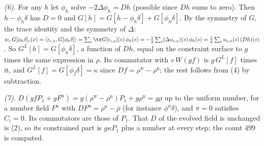 \emph{(6).} For any $h$ let $\phi_{h}$ solve $-2\Delta\phi_{h} = Dh$ (possible since $Dh$ sums to zero). Then $h - \phi_{h}\delta$ has $D = 0$ and $G[h] = G[h - \phi_{h}\delta] + G[\phi_{h}\delta]$. By the symmetry of $G$, the trace identity and the symmetry of $\Delta$: $w_{c}\,G[\phi_{h}\delta]_{c}(x) = \langle\epsilon_{c,x}, G[\phi_{h}\delta]\rangle = \sum_{s}\tr G[\epsilon_{c,x}](s)\,\phi_{h}(s) = -\tfrac12\sum_{s}(\Delta u_{c,x})(s)\,\phi_{h}(s) = \tfrac14\sum_{s}u_{c,x}(s)\,(Dh)(s)$. So $G^{L}[h] = G[\phi_{h}\delta]$, a function of $Dh$, equal on the constraint surface to $g$ times the same expression in $\rho$. Its commutator with $v\,W(gf)$ is $g\,G^{L}[f]$ times it, and $G^{L}[f] = G[\phi_{f}\delta] = \kappa$ since $Df = \rho^{\mathrm{w}} - \rho^{\mathrm{n}}$; the rest follows from (4) by subtraction.

\emph{(7).} $D(g f P_{1} + gF^{\mathrm{n}}) = g(\rho^{\mathrm{w}} - \rho^{\mathrm{n}})P_{1} + g\rho^{\mathrm{n}} = g\rho$ up to the uniform number, for a number field $F^{\mathrm{n}}$ with $DF^{\mathrm{n}} = \rho^{\mathrm{n}} - \bar\rho$ (for instance $\phi^{\mathrm{n}}\delta$), and $\pi = 0$ satisfies $C_{i} = 0$. Its commutators are those of $P_{1}$. That $D$ of the evolved field is unchanged is (2), so its constrained part is $g\kappa P_{1}$ plus a number at every step; the count $499$ is computed.

